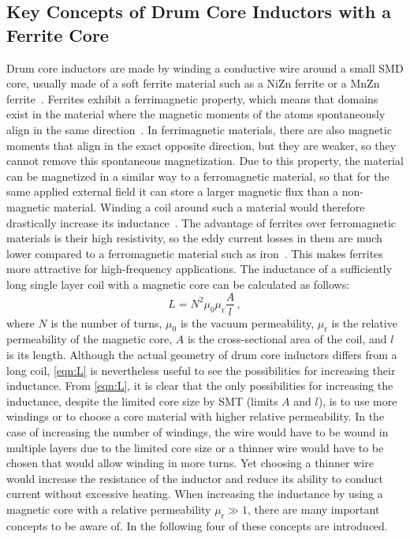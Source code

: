 \subsection{Key Concepts of Drum Core Inductors with a Ferrite Core}
Drum core inductors are made by winding a conductive wire around a small SMD core, usually made of a soft ferrite material such as a NiZn ferrite or a MnZn ferrite~\cite{snelling}. Ferrites exhibit a ferrimagnetic property, which means that domains exist in the material where the magnetic moments of the atoms spontaneously align in the same direction~\cite{snelling}. In ferrimagnetic materials, there are also magnetic moments that align in the exact opposite direction, but they are weaker, so they cannot remove this spontaneous magnetization. Due to this property, the material can be magnetized in a similar way to a ferromagnetic material, so that for the same applied external field it can store a larger magnetic flux than a non-magnetic material. Winding a coil around such a material would therefore drastically increase its inductance~\cite{snelling}. The advantage of ferrites over ferromagnetic materials is their high resistivity, so the eddy current losses in them are much lower compared to a ferromagnetic material such as iron~\cite{sistan}. This makes ferrites more attractive for high-frequency applications. The inductance of a sufficiently long single layer coil with a magnetic core can be calculated as follows:
\begin{equation} \label{eqn:L}
	L = N^2\mu_0\mu_\mathrm{r}\frac{A}{l}\,,
\end{equation} 
where $N$ is the number of turns, $\mu_0$ is the vacuum permeability, $\mu_\mathrm{r}$ is the relative permeability of the magnetic core, $A$ is the cross-sectional area of the coil, and $l$ is its length. Although the actual geometry of drum core inductors differs from a long coil, \eqref{eqn:L} is nevertheless useful to see the possibilities for increasing their inductance. From \eqref{eqn:L}, it is clear that the only possibilities for increasing the inductance, despite the limited core size by SMT (limits $A$ and $l$), is to use more windings or to choose a core material with higher relative permeability. In the case of increasing the number of windings, the wire would have to be wound in multiple layers due to the limited core size or a thinner wire would have to be chosen that would allow winding in more turns. Yet choosing a thinner wire would increase the resistance of the inductor and reduce its ability to conduct current without excessive heating. When increasing the inductance by using a magnetic core with a relative permeability $\mu_\mathrm{r} \gg 1$, there are many important concepts to be aware of. In the following four of these concepts are introduced.

